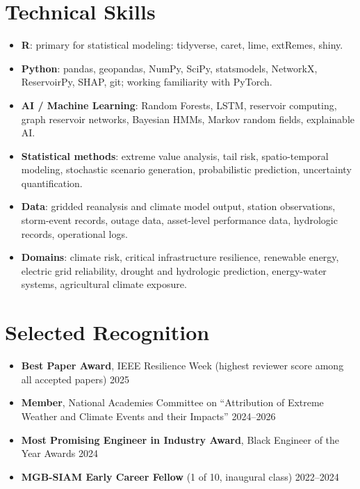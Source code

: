 \documentclass{article}[12pt]
\begin{document}
	\section*{Technical Skills}
	\vspace{-0.5em}
	\begin{itemize}[leftmargin=*]
		\itemsep0em
		\item \textbf{R}: primary for statistical modeling: tidyverse, caret, lime, extRemes, shiny.
		\item \textbf{Python}: pandas, geopandas, NumPy, SciPy, statsmodels, NetworkX, ReservoirPy, SHAP, git; working familiarity with PyTorch.
		\item \textbf{AI / Machine Learning}: Random Forests, LSTM, reservoir computing, graph reservoir networks, Bayesian HMMs, Markov random fields, explainable AI.
		\item \textbf{Statistical methods}: extreme value analysis, tail risk, spatio-temporal modeling, stochastic scenario generation, probabilistic prediction, uncertainty quantification.
		\item \textbf{Data}: gridded reanalysis and climate model output, station observations, storm-event records, outage data, asset-level performance data, hydrologic records, operational logs.
		\item \textbf{Domains}: climate risk, critical infrastructure resilience, renewable energy, electric grid reliability, drought and hydrologic prediction, energy-water systems, agricultural climate exposure.
	\end{itemize}
	
	\vspace{-1em}
	\section*{Selected Recognition}
	\vspace{-0.5em}
	\begin{itemize}[leftmargin=*]
		\itemsep0em
		\item \textbf{Best Paper Award}, IEEE Resilience Week (highest reviewer score among all accepted papers) \hfill 2025
		\item \textbf{Member}, National Academies Committee on ``Attribution of Extreme Weather and Climate Events and their Impacts'' \hfill 2024--2026
		\item \textbf{Most Promising Engineer in Industry Award}, Black Engineer of the Year Awards \hfill 2024
		\item \textbf{MGB-SIAM Early Career Fellow} (1 of 10, inaugural class) \hfill{}2022--2024
	\end{itemize}
	
\end{document}
